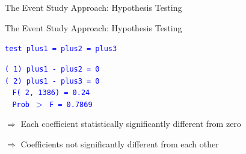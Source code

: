 \documentclass[10pt,xcolor=table,ignorenonframetext,handout,aspectratio=169]{beamer}
\begin{document}

\begin{frame}{The Event Study Approach:  Hypothesis Testing}

\begin{center}
\end{center}

\end{frame}



\begin{frame}{The Event Study Approach:  Hypothesis Testing}

\begin{small}
	\textcolor{blue}{\texttt{test plus1 = plus2 = plus3}} \\
	
	\medskip
	
	\textcolor{blue}{\texttt{( 1)  plus1 - plus2 = 0}} \\
	\textcolor{blue}{\texttt{( 2)  plus1 - plus3 = 0}} \\
	
	\medskip
	\textcolor{blue}{\texttt{$\ \ \ \ $F(  2,  1386) =    0.24}} \\
	\textcolor{blue}{\texttt{$\ \ \ \ $Prob $>$ F =    0.7869}} 
	
\end{small}

\medskip
\medskip

$\Rightarrow$ Each coefficient statistically significantly different from zero

\medskip

$\Rightarrow$ Coefficients not significantly different from each other
\end{frame}
\end{document}
